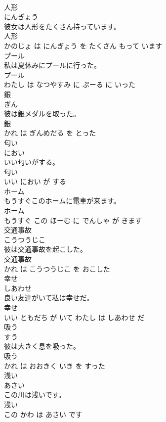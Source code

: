 \documentclass[8pt]{extreport}
\begin{document}
\begin{CJK}{UTF8}{min}
\\	人形	
\\	にんぎょう			
\\	彼女は人形をたくさん持っています。	
\\	人形 
\\	かのじょ は にんぎょう を たくさん もって います			
\\	プール	
\\	私は夏休みにプールに行った。	
\\	プール 
\\	わたし は なつやすみ に ぷーる に いった			
\\	銀	
\\	ぎん			
\\	彼は銀メダルを取った。	
\\	銀 
\\	かれ は ぎんめだる を とった			
\\	匂い	
\\	におい			
\\	いい匂いがする。	
\\	匂い 
\\	いい におい が する			
\\	ホーム	
\\	もうすぐこのホームに電車が来ます。	
\\	ホーム 
\\	もうすぐ この ほーむ に でんしゃ が きます			
\\	交通事故	
\\	こうつうじこ			
\\	彼は交通事故を起こした。	
\\	交通事故 
\\	かれ は こうつうじこ を おこした			
\\	幸せ	
\\	しあわせ			
\\	良い友達がいて私は幸せだ。	
\\	幸せ 
\\	いい ともだち が いて わたし は しあわせ だ			
\\	吸う	
\\	すう			
\\	彼は大きく息を吸った。	
\\	吸う 
\\	かれ は おおきく いき を すった			
\\	浅い	
\\	あさい			
\\	この川は浅いです。	
\\	浅い 
\\	この かわ は あさい です			

\end{CJK}
\end{document}
